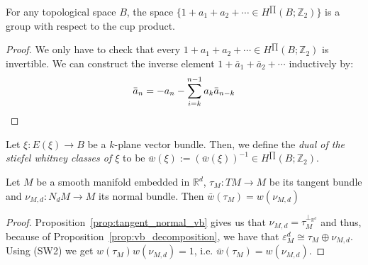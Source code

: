 \begin{lemma} For any topological space $B$, the space $\big\{1+a_1+a_2+\cdots\in H^{\prod}(B;\mathbb{Z}_2)\big\}$ is a group with respect to the cup product.
\end{lemma}
\begin{proof} We only have to check that every $1+a_1+a_2+\cdots\in H^{\prod}(B;\mathbb{Z}_2)$ is invertible. We can construct the inverse element $1+\bar{a}_1+\bar{a}_2+\cdots$ inductively by:
\[\bar{a}_n=-a_n-\sum_{i=k}^{n-1}a_k\bar{a}_{n-k}\qedhere\]
\end{proof}

\begin{definition}\label{def:dual_sw} Let $\xi:E(\xi)\to B$ be a $k$-plane vector bundle. Then, we define the \emph{dual of the stiefel whitney classes of $\xi$} to be $\bar{w}(\xi):=(\bar{w}(\xi))^{-1}\in H^{\prod}(B;\mathbb{Z}_2)$.
\end{definition}

\begin{proposition} Let $M$ be a smooth manifold embedded in $\mathbb{R}^d$, $\tau_M:TM\to M$ be its tangent bundle and $\nu_{M,d}:N_dM\to M$ its normal bundle. Then $\bar{w}(\tau_M)=w(\nu_{M,d})$
\end{proposition}
\begin{proof} Proposition~\ref{prop:tangent_normal_vb} gives us that $\nu_{M,d}=\tau_M^{\perp_{\mathbb{R}^d}}$ and thus, because of Proposition~\ref{prop:vb_decomposition}, we have that $\varepsilon_M^d\cong\tau_M\oplus\nu_{M,d}$. Using (SW2) we get $w(\tau_M)w(\nu_{M,d})=1$, i.e. $\bar{w}(\tau_M)=w(\nu_{M,d})$.
\end{proof}

